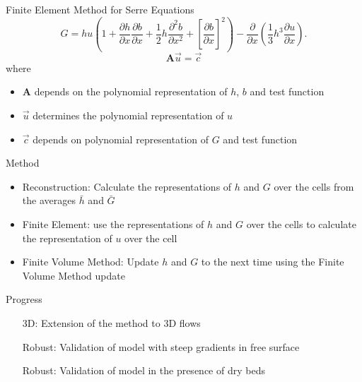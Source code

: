\documentclass[handout]{beamer}
\begin{document}
\begin{frame}{Finite Element Method for Serre Equations}
		\[ G =  h {u} \left(1 + \frac{\partial h}{\partial x}\frac{\partial b}{\partial x} + \frac{1}{2}h\frac{\partial^2 b}{\partial x^2} + \left[\frac{\partial b}{\partial x}\right]^2 \right) - \frac{\partial}{\partial x}\left(\frac{1}{3}h^3  \frac{\partial {u}}{\partial x}\right).\]
	\pause
	\begin{equation*}
	\boldsymbol{A} \vec{u} = \vec{c}
	\end{equation*}
	where 
	\begin{itemize}
		\item $\boldsymbol{A}$ depends on the polynomial representation of $h$, $b$ and test function
		\item $\vec{u}$ determines the polynomial representation of $u$
		\item $\vec{c}$ depends on polynomial representation of $G$ and test function
	\end{itemize}
\end{frame}


\begin{frame}{Method}
	\begin{itemize}
		\item Reconstruction: Calculate the representations of $h$ and $G$ over the cells from the averages $\bar{h}$ and $\bar{G}$
		\item Finite Element: use the representations of $h$ and $G$ over the cells to calculate the representation of $u$ over the cell
		\item Finite Volume Method: Update $h$ and $G$ to the next time using the Finite Volume Method update
	\end{itemize}
\end{frame}

\begin{frame}{Progress}
	\begin{itemize}
		\item[3D:] Extension of the method to 3D flows  \checkmark
		\item[Robust:] Validation of model with steep gradients in free surface
		\item[Robust:] Validation of model in the presence of dry beds
	\end{itemize}
\end{frame}
\end{document}
